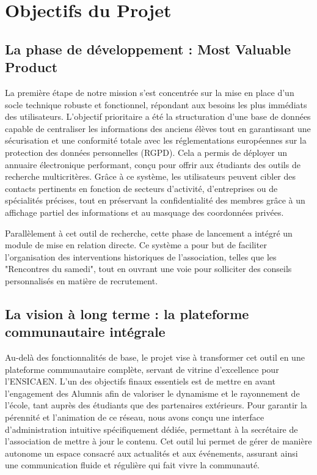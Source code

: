 \documentclass[a4paper,12pt]{article}
\begin{document}
\newpage

\section{Objectifs du Projet}

\subsection{La phase de développement : Most Valuable Product}
La première étape de notre mission s’est concentrée sur la mise en place d'un socle technique robuste et fonctionnel, répondant aux besoins les plus immédiats des utilisateurs. L'objectif prioritaire a été la structuration d'une base de données capable de centraliser les informations des anciens élèves tout en garantissant une sécurisation et une conformité totale avec les réglementations européennes sur la protection des données personnelles (RGPD). Cela a permis de déployer un annuaire électronique performant, conçu pour offrir aux étudiants des outils de recherche multicritères. Grâce à ce système, les utilisateurs peuvent cibler des contacts pertinents en fonction de secteurs d'activité, d'entreprises ou de spécialités précises, tout en préservant la confidentialité des membres grâce à un affichage partiel des informations et au masquage des coordonnées privées.

Parallèlement à cet outil de recherche, cette phase de lancement a intégré un module de mise en relation directe. Ce système a pour but de faciliter l'organisation des interventions historiques de l'association, telles que les "Rencontres du samedi", tout en ouvrant une voie pour solliciter des conseils personnalisés en matière de recrutement.

\subsection{La vision à long terme : la plateforme communautaire intégrale}
Au-delà des fonctionnalités de base, le projet vise à transformer cet outil en une plateforme communautaire complète, servant de vitrine d'excellence pour l'ENSICAEN. L'un des objectifs finaux essentiels est de mettre en avant l'engagement des Alumnis afin de valoriser le dynamisme et le rayonnement de l'école, tant auprès des étudiants que des partenaires extérieurs. Pour garantir la pérennité et l'animation de ce réseau, nous avons conçu une interface d'administration intuitive spécifiquement dédiée, permettant à la secrétaire de l'association de mettre à jour le contenu. Cet outil lui permet de gérer de manière autonome un espace consacré aux actualités et aux événements, assurant ainsi une communication fluide et régulière qui fait vivre la communauté.
\end{document}
